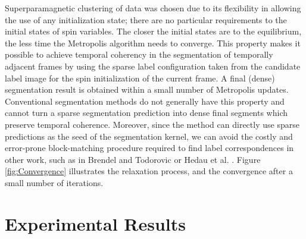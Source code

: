 Superparamagnetic clustering of data was chosen due to its flexibility in allowing the use of any initialization state; there are no particular requirements to the initial states of spin variables. The closer the initial states are to the equilibrium, the less time the Metropolis algorithm needs to converge. This property makes it possible to achieve temporal coherency in the segmentation of temporally adjacent frames by using the sparse label configuration taken from the candidate label image for the spin initialization of the current frame. A final (dense) segmentation result is obtained within a small number of Metropolis updates. Conventional segmentation methods do not generally have this property and cannot turn a sparse segmentation prediction into dense final segments which preserve temporal coherence. Moreover, since the method can directly use sparse predictions as the seed of the segmentation kernel, we can avoid the costly and error-prone block-matching procedure required to find label correspondences in other 
work, such as in Brendel and Todorovic \cite{SegTrackRegions} or Hedau et al.  \cite{MatchingUnstable}. Figure \ref{fig:Convergence} illustrates the relaxation process, and the convergence after a small number of iterations. 

\section{Experimental Results}
\label{sec:Experimental Results}

